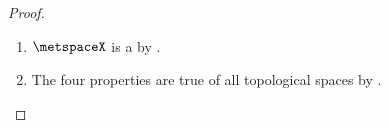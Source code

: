 \begin{proof}
\begin{enumerate}
  \item $\metspaceX$ is a  by .
  \item The four properties are true of all topological spaces by .
\end{enumerate}
%
%
%
%
\end{proof}


